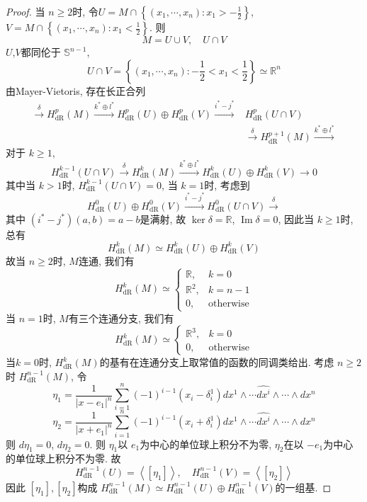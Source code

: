 \documentclass[../main.tex]{subfiles}
\begin{document}
\begin{proof}
当 $n\ge 2$时,
令$U= M\cap \left\{ \left(x_1,\cdots ,x_{n}\right): x_1> -\frac{1}{2} \right\}$, $V= M\cap \left\{ \left(x_1,\cdots ,x_{n}\right): x_1< \frac{1}{2} \right\}$. 则
$$ M= U\cup V,\quad U\cap V $$
$U$,$V$都同伦于 $\mathbb{S}^{n-1}$,
 $$ U\cap V= \left\{ \left(x_1,\cdots ,x_{n}\right) : -\frac{1}{2}< x_1< \frac{1}{2} \right\} \simeq \mathbb{R} ^{n}$$
由Mayer-Vietoris, 存在长正合列
$$
\begin{aligned}
\xrightarrow{\delta} H_{\operatorname{dR}}^p(M) \xrightarrow{k^* \oplus l^*} H_{\operatorname{dR}}^p(U) \oplus H_{\operatorname{dR}}^p(V) \xrightarrow{i^* - j^*} & H_{\operatorname{dR}}^p(U \cap V) \\
& \xrightarrow{\delta} H_{\operatorname{dR}}^{p+1}(M) \xrightarrow{k^* \oplus l^*}
\end{aligned}
$$
对于 $k\ge 1$,
 $$ H_{\mathrm{dR}}^{k-1}\left(U\cap V\right)\xrightarrow{\delta }H_{\mathrm{dR}}^{k}\left(M\right)\xrightarrow{k^{*}\oplus l^{*}}H_{\mathrm{dR}}^{k}\left(U\right)\oplus H_{\mathrm{dR}}^{k}\left(V\right)\to 0  $$
其中当 $k> 1$时, $H_{\mathrm{dR}}^{k-1}\left(U\cap V\right)= 0$, 当 $k= 1$时, 考虑到
$$ H_{\mathrm{dR}}^{0}\left(U\right)\oplus H_{\mathrm{dR}}^{0}\left(V\right)\xrightarrow{i^{*}-j^{*}} H_{\mathrm{dR}}^{0}\left(U\cap V\right)\xrightarrow{\delta }   $$
其中 $\left(i^{*}-j^{*}\right)\left(a,b\right)= a-b$是满射, 故 $\operatorname{ker}\delta =\mathbb{R}$,
  $\operatorname{Im}\delta = 0$, 因此当 $k\ge 1$时, 总有
$$ H_{\mathrm{dR}}^{k}\left(M\right)\simeq H_{\mathrm{dR}}^{k} \left(U\right)\oplus H_{\mathrm{dR}}^{k}\left(V\right)$$
故当 $n\ge 2$时, $M$连通, 我们有
 $$ H_{\mathrm{dR}}^{k}\left(M\right)\simeq \begin{cases} \mathbb{R} ,&k= 0\\\mathbb{R} ^{2},&k= n-1\\0,&\text{otherwise} \end{cases}  $$
当 $n = 1$时,  $M$有三个连通分支, 我们有
 $$ H_{\mathrm{dR}}^{k}\left(M\right)\simeq \begin{cases} \mathbb{R} ^{3},&k= 0\\0,&\text{otherwise} \end{cases}  $$
当$k= 0$时,  $H_{\mathrm{dR}}^{k}\left(M\right)$的基有在连通分支上取常值的函数的同调类给出. 考虑 $n\ge 2$时 $H_{\mathrm{dR}}^{n-1}\left(M\right)$, 令
 $$ \eta _1 = \frac{1 }{\left| x-e_1 \right|^{n}  }\sum _{i= 1}^{n}\left(-1\right)^{i-1}\left(x_{i}-\delta _{i}^{1}\right)d x^{1}\wedge \cdots \widehat{dx^{i}}\wedge \cdots \wedge dx^{n} $$
 $$ \eta _2 = \frac{1 }{\left| x+ e_1 \right|^{n}  }\sum _{i= 1}^{n}\left(-1\right)^{i-1}\left(x_{i}+ \delta _{i}^{1}\right)dx^{1}\wedge \cdots   \widehat{dx^{i}}\wedge \cdots \wedge dx^{n} $$
则 $d \eta _1= 0$, $d \eta _2 = 0$. 则 $\eta _1$以 $e_1$为中心的单位球上积分不为零,  $\eta _2$在以 $-e_1$为中心的单位球上积分不为零. 故
$$ H_{\mathrm{dR}}^{n-1}\left(U\right)= \left< [\eta _1 ] \right>,\quad H_{\mathrm{dR}}^{n-1}\left(V\right)= \left< \left[ \eta _2  \right] \right> $$
因此 $\left[ \eta _1  \right], \left[ \eta _2  \right]$构成 $H_{\mathrm{dR}}^{n-1}\left(M\right)\simeq H_{\mathrm{dR}}^{n-1}\left(U\right)\oplus H _{\mathrm{dR}}^{n-1}\left(V\right)$的一组基.
\end{proof}
\end{document}
